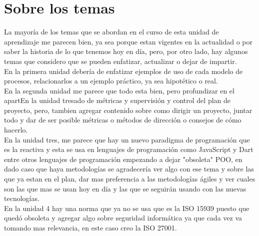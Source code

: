 \documentclass[12pt,twoside]{article}
\begin{document}
\section{Sobre los temas}

La mayoría de los temas que se abordan en el curso de esta unidad de aprendizaje me parecen bien,
ya sea porque estan vigentes en la actualidad o por saber la historia de lo que tenemos 
hoy en día, pero, por otro lado, hay algunos temas que considero que se pueden enfatizar, actualizar
o dejar de impartir.\\

En la primera unidad debería de enfatizar ejemplos de uso de cada modelo de procesos,
relacionarlos a un ejemplo práctico, ya sea hipotético o real.\\

En la segunda unidad me parece que todo esta bien, pero profundizar en el apartEn la unidad tresado de métricas
y supervisión y control del plan de proyecto, pero, tambien agregar contenido sobre como dirigir
un proyecto, juntar todo y dar de ser posible métricas o métodos de dirección o consejos
de cómo hacerlo.\\

En la unidad tres, me parece que hay un nuevo paradigma de programación que es la reactiva y esta
se usa en lenguajes de programación como JavaScript y Dart entre otros lenguajes de programación
empezando a dejar "obsoleta" POO, en dado caso que haya metodologías se agradecería ver algo
con ese tema y sobre las que ya estan en el plan, dar mas preferencia a las metodologías
ágiles y ver cuales son las que mas se usan hoy en día y las que se seguirán usando 
con las nuevas tecnologías.\\

En la unidad 4 hay una norma que ya no se usa que es la ISO 15939 puesto que quedó obsoleta
y agregar algo sobre seguridad informática ya que cada vez va tomando mas relevancia, en este
caso creo la ISO 27001.\\
\end{document}
